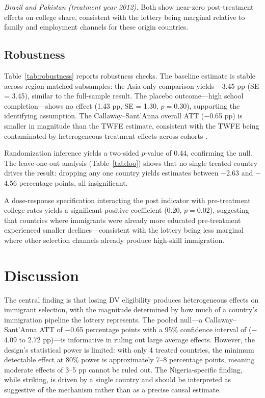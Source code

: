 \documentclass[12pt]{article}
\begin{document}
\textit{Brazil and Pakistan (treatment year 2012).} Both show near-zero post-treatment effects on college share, consistent with the lottery being marginal relative to family and employment channels for these origin countries.

\subsection{Robustness}



Table~\ref{tab:robustness} reports robustness checks. The baseline estimate is stable across region-matched subsamples: the Asia-only comparison yields $-$3.45 pp (SE = 3.45), similar to the full-sample result. The placebo outcome---high school completion---shows no effect (1.43 pp, SE = 1.30, $p = 0.30$), supporting the identifying assumption. The Callaway--Sant'Anna overall ATT ($-$0.65 pp) is smaller in magnitude than the TWFE estimate, consistent with the TWFE being contaminated by heterogeneous treatment effects across cohorts \citep{GoodmanBacon2021}.

Randomization inference yields a two-sided $p$-value of 0.44, confirming the null. The leave-one-out analysis (Table~\ref{tab:loo}) shows that no single treated country drives the result: dropping any one country yields estimates between $-$2.63 and $-$4.56 percentage points, all insignificant.



A dose-response specification interacting the post indicator with pre-treatment college rates yields a significant positive coefficient (0.20, $p = 0.02$), suggesting that countries where immigrants were already more educated pre-treatment experienced smaller declines---consistent with the lottery being less marginal where other selection channels already produce high-skill immigration.

\section{Discussion}

The central finding is that losing DV eligibility produces heterogeneous effects on immigrant selection, with the magnitude determined by how much of a country's immigration pipeline the lottery represents. The pooled null---a Callaway--Sant'Anna ATT of $-$0.65 percentage points with a 95\% confidence interval of ($-$4.09 to 2.72 pp)---is informative in ruling out large average effects. However, the design's statistical power is limited: with only 4 treated countries, the minimum detectable effect at 80\% power is approximately 7--8 percentage points, meaning moderate effects of 3--5 pp cannot be ruled out. The Nigeria-specific finding, while striking, is driven by a single country and should be interpreted as suggestive of the mechanism rather than as a precise causal estimate.
\end{document}
